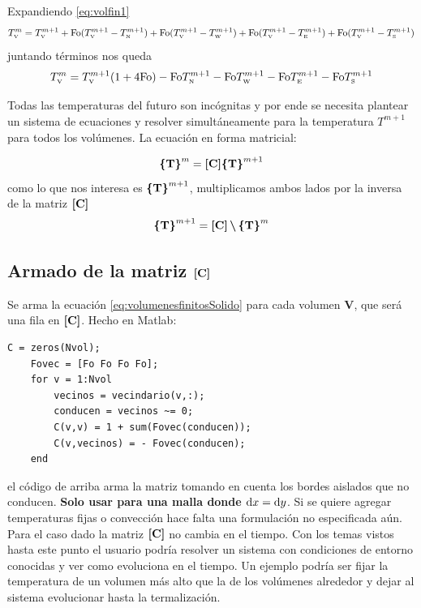 \documentclass[11pt, titlepage]{article}
\begin{document}
Expandiendo \eqref{eq:volfin1}
\begin{equation}
    T_{\text{\tiny V}}^m =T_{\text{\tiny V}}^{m+1} + {\mathrm{Fo}}(T_{\text{\tiny V}}^{m+1}-T_{\text{\tiny N}}^{m+1})+{\mathrm{Fo}}(T_{\text{\tiny V}}^{m+1}-T_{\text{\tiny W}}^{m+1})+{\mathrm{Fo}}(T_{\text{\tiny V}}^{m+1}-T_{\text{\tiny E}}^{m+1})+{\mathrm{Fo}}(T_{\text{\tiny V}}^{m+1}-T_{\text{\tiny S}}^{m+1})
\end{equation}
juntando términos nos queda
\begin{equation} \label{eq:volumenesfinitosSolido}
    T_{\text{\tiny V}}^m = T_{\text{\tiny V}}^{m+1}(1+4{\mathrm{Fo}}) - {\mathrm{Fo}} T_{\text{\tiny N}}^{m+1} - {\mathrm{Fo}} T_{\text{\tiny W}}^{m+1} - {\mathrm{Fo}} T_{\text{\tiny E}}^{m+1} - {\mathrm{Fo}} T_{\text{\tiny S}}^{m+1}
\end{equation}

Todas las temperaturas del futuro son incógnitas y por ende se necesita plantear un sistema de ecuaciones y resolver simultáneamente para la temperatura $T^{m+1}$ para todos los volúmenes. La ecuación en forma matricial:

\[
\boldsymbol{\{ } \boldsymbol{ \mathrm{T} } \boldsymbol{\} }^{m} =  \boldsymbol{[ } \boldsymbol{ \mathrm{C} } \boldsymbol{] } \boldsymbol{\{ } \boldsymbol{ \mathrm{T} } \boldsymbol{\} }^{m+1}
\]
como lo que nos interesa es $\boldsymbol{\{ } \boldsymbol{ \mathrm{T} } \boldsymbol{\} }^{m+1}$, multiplicamos ambos lados por la inversa de la matriz $\boldsymbol{[ } \boldsymbol{ \mathrm{C} } \boldsymbol{] }$
\begin{equation}
\boldsymbol{\{ } \boldsymbol{ \mathrm{T} } \boldsymbol{\} }^{m+1} = \boldsymbol{[ } \boldsymbol{ \mathrm{C} } \boldsymbol{] } \,{\boldsymbol{\backslash}}\, \boldsymbol{\{ } \boldsymbol{ \mathrm{T} } \boldsymbol{\} }^{m} 
\end{equation}

\subsection[Armado de la matriz \textbf{C}]{Armado de la matriz $\boldsymbol{[ } \boldsymbol{ \mathrm{C} } \boldsymbol{] }$}

Se arma la ecuación \ref{eq:volumenesfinitosSolido} para cada volumen \textbf{V}, que será una fila en $\boldsymbol{[ } \boldsymbol{ \mathrm{C} } \boldsymbol{] }$. Hecho en Matlab:
\begin{lstlisting}[caption = {Se arma la matriz $\Mme{C}$ para volúmenes cuadrados.}]
    C = zeros(Nvol);
    Fovec = [Fo Fo Fo Fo];
    for v = 1:Nvol
        vecinos = vecindario(v,:);
        conducen = vecinos ~= 0;
        C(v,v) = 1 + sum(Fovec(conducen));
        C(v,vecinos) = - Fovec(conducen);
    end
\end{lstlisting}
el código de arriba arma la matriz tomando en cuenta los bordes aislados que no conducen. \textbf{Solo usar para una malla donde $\mathrm{d} x=\mathrm{d} y$}. Si se quiere agregar temperaturas fijas o convección hace falta una formulación no especificada aún. Para el caso dado la matriz $\boldsymbol{[ } \boldsymbol{ \mathrm{C} } \boldsymbol{] }$ no cambia en el tiempo. Con los temas vistos hasta este punto el usuario podría resolver un sistema con condiciones de entorno conocidas y ver como evoluciona en el tiempo. Un ejemplo podría ser fijar la temperatura de un volumen más alto que la de los volúmenes alrededor y dejar al sistema evolucionar hasta la termalización.
\end{document}
